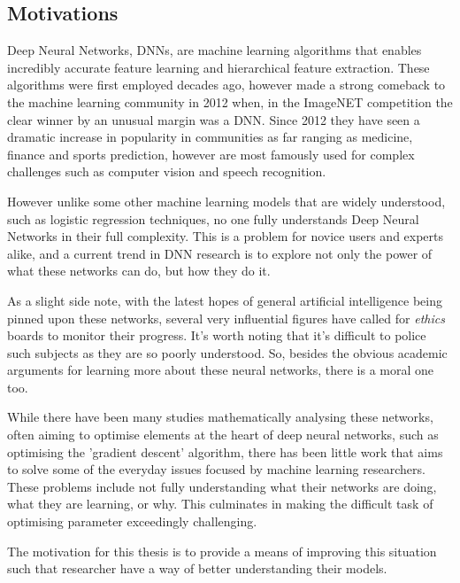 \documentclass[a4paper,11pt,titlepage]{article}
\begin{document}
	\subsection{Motivations}

	Deep Neural Networks, DNNs, are machine learning algorithms that enables incredibly accurate feature learning and hierarchical feature extraction. These algorithms were first employed decades ago, however made a strong comeback to the machine learning community in 2012 when, in the ImageNET competition the clear winner by an unusual margin was a DNN. Since 2012 they have seen a dramatic increase in popularity in communities as far ranging as medicine, finance and sports prediction, however are most famously used for complex challenges such as computer vision and speech recognition.
\par 
However unlike some other machine learning models that are widely understood, such as logistic regression techniques, no one fully understands Deep Neural Networks in their full complexity. This is a problem for novice users and experts alike, and a current trend in DNN research is to explore not only the power of what these networks can do, but how they do it. 
\par
As a slight side note, with the latest hopes of general artificial intelligence being pinned upon these networks, several very influential figures have called for \textit{ethics} boards to monitor their progress. It's worth noting that it's difficult to police such subjects as they are so poorly understood. So, besides the obvious academic arguments for learning more about these neural networks, there is a moral one too.
\par 
While there have been many studies mathematically analysing these networks, often aiming to optimise elements at the heart of deep neural networks, such as optimising the 'gradient descent' algorithm, there has been little work that aims to solve some of the everyday issues focused by machine learning researchers. These problems include not fully understanding what their networks are doing, what they are learning, or why. This culminates in making the difficult task of optimising parameter exceedingly challenging.
\par
The motivation for this thesis is to provide a means of improving this situation such that researcher have a way of better understanding their models.
\end{document}
